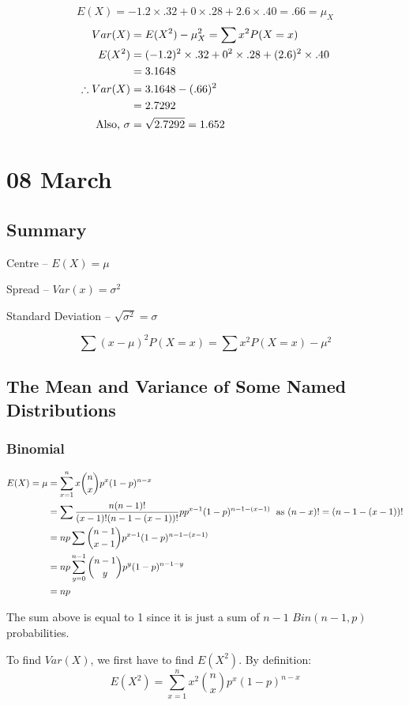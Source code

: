 \documentclass[12pt]{article}
\begin{document}
\[
    E(X) = -1.2 \times .32 + 0 \times .28 + 2.6 \times .40 = .66 = \mu_X
\]
\begin{align*}
    Var(X) &= E(X^2) - \mu_X^2 = \sum x^2 P(X = x) \\
    E(X^2) &= (-1.2)^2 \times .32 + 0^2 \times .28 + (2.6)^2 \times .40 \\
        &= 3.1648 \\
    \therefore Var(X) &= 3.1648 - (.66)^2 \\
        &= 2.7292 \\
    \textnormal{Also, } \sigma &= \sqrt{2.7292} = 1.652
\end{align*}

\section{08 March}
\subsection{Summary}
Centre -- $E(X) = \mu$

Spread -- $Var(x) = \sigma^2$

Standard Deviation -- $\sqrt{\sigma^2} = \sigma$

\[
    \sum (x - \mu)^2 P(X = x) = \sum x^2 P(X = x) - \mu^2
\]

\subsection{The Mean and Variance of Some Named Distributions}
\subsubsection{Binomial}
\begin{align*}
    E(X) = \mu &= \sum_{x=1}^{n} x {n \choose x} p^x (1-p)^{n-x} \\
        &= \sum \frac{n(n-1)!}{(x-1)! (n-1-(x-1))!} p p^{x-1} (1-p)^{n-1-(x-1)} \; \textnormal{ as } (n-x)! = (n-1-(x-1))! \\
        &= n p \sum {{n-1} \choose {x-1}} p^{x-1} (1-p)^{n-1-(x-1)} \\
        &= n p \sum_{y=0}^{n-1} {{n-1} \choose y} p^y (1-p)^{n-1-y} \\
        &= n p
\end{align*}

The sum above is equal to 1 since it is just a sum of $n-1$ $Bin(n-1,p)$ probabilities.

To find $Var(X)$, we first have to find $E(X^2)$. By definition:
\[
    E(X^2) = \sum_{x=1}^{n} x^2 {n \choose x} p^x (1-p)^{n-x}
\]
\end{document}
